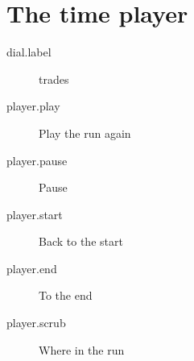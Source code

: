 \section{The time player}


\begin{description}
  \item[dial.label]  trades
  \item[player.play] Play the run again
  \item[player.pause] Pause
  \item[player.start] Back to the start
  \item[player.end] To the end
  \item[player.scrub] Where in the run
\end{description}
